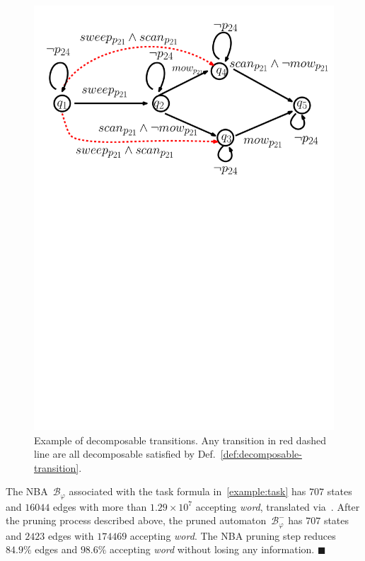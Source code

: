 \begin{figure}
\centering
\includegraphics[scale=0.4]{figures/example_decomposable.pdf}
\caption{
Example of decomposable transitions.
Any transition in red dashed line are all 
decomposable satisfied by Def.~\ref{def:decomposable-transition}.}
\label{fig:example_decomposable}
\end{figure}

\begin{example}\label{eq:prune-nba}
The NBA~$\mathcal{B}_{\varphi}$ associated with the task formula in~\eqref{example:task}
has $707$ states and $16044$ edges with more than $1.29\times10^7$ accepting \emph{word},
translated via~\cite{gastin2001fast}.
After the pruning process described above, the pruned automaton~$\mathcal{B}^{-}_{\varphi}$
has $707$ states and $2423$ edges with $174469$ accepting \emph{word}. The NBA pruning step reduces $84.9\%$ edges and $98.6\%$
accepting \emph{word} without losing any information.
\hfill $\blacksquare$
\end{example}
